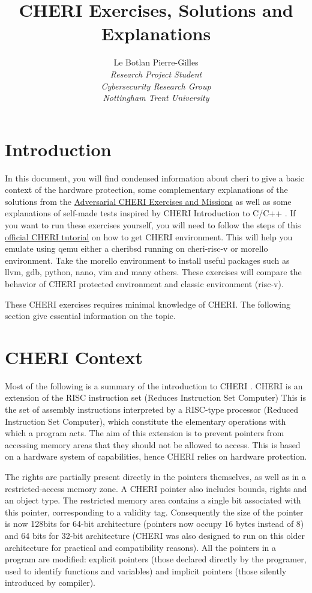 \documentclass[a4paper, 11pt]{article}
\title{CHERI Exercises, Solutions and Explanations}
\author{Le Botlan Pierre-Gilles \\\textit{Research Project Student} \\ \textit{Cybersecurity Research Group} \\ \textit{Nottingham Trent University} }
\begin{document}
\maketitle
\tableofcontents
{}

\section{Introduction}
In this document, you will find condensed information about \Gls{cheri} to give a basic context of the hardware protection, some complementary explanations of the solutions from the \href{https://ctsrd-cheri.github.io/cheri-exercises/cover/index.html}{Adversarial CHERI Exercises and Missions} as well as some explanations of self-made tests inspired by CHERI Introduction to C/C++ \cite{watson2020cheri}. 
If you want to run these exercises yourself, you will need to follow the steps of this \href{https://ctsrd-cheri.github.io/cheri-faq/#how-can-i-emulate-a-cheri-enabled-environment}{official CHERI tutorial} on how to get CHERI environment. This will help you emulate using \Gls{qemu} either a \Gls{cheribsd} running on \Gls{cheri-risc-v} or \Gls{morello} environment. Take the \Gls{morello} environment to install useful packages such as llvm, gdb, python, nano, vim and many others.
These exercises will compare the behavior of CHERI protected environment and classic environment (\Gls{risc-v}).

These CHERI exercises requires minimal knowledge of CHERI. The following section give essential information on the topic.

\printnoidxglossaries


\section{CHERI Context}
Most of the following is a summary of the introduction to CHERI \cite{watson2019introduction}.
CHERI is an extension of the RISC instruction set (Reduces Instruction Set Computer)
This is the set of assembly instructions interpreted by a RISC-type processor (Reduced Instruction Set Computer), which constitute the elementary operations with which a program acts.
The aim of this extension is to prevent pointers from accessing memory areas that they should not be allowed to access. This is based on a hardware system of capabilities, hence CHERI relies on hardware protection.

The rights are partially present directly in the pointers themselves, as well as in a restricted-access memory zone. A CHERI pointer also includes bounds, rights and an object type. 
The restricted memory area contains a single bit associated with this pointer, corresponding to a validity tag.
Consequently the size of the pointer is now 128bits for 64-bit architecture (pointers now occupy 16 bytes instead of 8) and 64 bits for 32-bit architecture (CHERI was also designed to run on this older architecture for practical and compatibility reasons). 
All the pointers in a program are modified: explicit pointers (those declared directly by the programer, used to identify functions and variables) and implicit pointers (those silently introduced by compiler).
\end{document}

